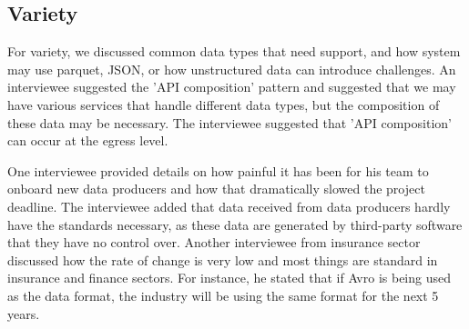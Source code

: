 \documentclass[a4paper,11pt,article,oneside]{memoir}
\begin{document}



\subsection{Variety}

For variety, we discussed common data types that need support, and how system may use parquet, JSON, or how unstructured data can introduce challenges. An interviewee suggested the 'API composition' pattern and suggested that we may have various services that handle different data types, but the composition of these data may be necessary. The interviewee suggested that 'API composition' can occur at the egress level. 

One interviewee provided details on how painful it has been for his team to onboard new data producers and how that dramatically slowed the project deadline. The interviewee added that data received from data producers hardly have the standards necessary, as these data are generated by third-party software that they have no control over. Another interviewee from insurance sector discussed how the rate of change is very low and most things are standard in insurance and finance sectors. For instance, he stated that if Avro is being used as the data format, the industry will be using the same format for the next 5 years. 


\end{document}
